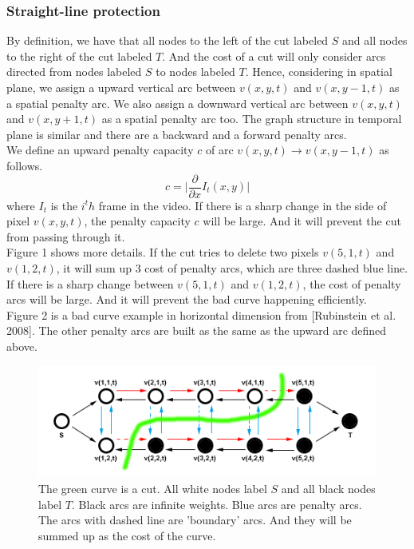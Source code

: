 \documentclass[a4paper, twocolumn]{article}
\begin{document}
			\subsubsection{Straight-line protection}
			By definition, we have that all nodes to the left of the cut labeled $S$ and all nodes to the right of the cut labeled $T$. And the cost of a cut will only consider arcs directed from nodes labeled $S$ to nodes labeled $T$. Hence, considering in spatial plane, we assign a upward vertical arc between $v(x,y,t)$ and $v(x,y-1,t)$ as a spatial penalty arc. We also assign a downward vertical arc between $v(x,y,t)$ and $v(x,y+1,t)$ as a spatial penalty arc too. The graph structure in temporal plane is similar and there are a backward and a forward penalty arcs.\\
			\linebreak
			We define an upward penalty capacity $c$ of arc $v(x,y,t) \rightarrow v(x,y-1,t)$ as follows.
			$$c = \lvert \frac{\partial}{\partial x}I_t(x,y)\lvert$$
			where $I_t$ is the $i^th$ frame in the video. If there is a sharp change in the side of pixel $v(x,y,t)$, the penalty capacity $c$ will be large. And it will prevent the cut from passing through it.\\
			\linebreak
			Figure 1 shows more details. If the cut tries to delete two pixels $v(5,1,t)$ and $v(1,2,t)$, it will sum up 3 cost of penalty arcs, which are three dashed blue line. If there is a sharp change between $v(5,1,t)$ and $v(1,2,t)$, the cost of penalty arcs will be large. And it will prevent the bad curve happening efficiently.\\
			\linebreak
			Figure 2 is a bad curve example in horizontal dimension from [Rubinstein et al. 2008]. The other penalty arcs are built as the same as the upward arc defined above.
			\begin{figure}
				\begin{center}
				\includegraphics[width=\linewidth]{Figure1.png}
				\caption{The green curve is a cut. All white nodes label $S$ and all black nodes label $T$. Black arcs are infinite weights. Blue arcs are penalty arcs. The arcs with dashed line are 'boundary' arcs. And they will be summed up as the cost of the curve.}
				\end{center}
			\end{figure}
\end{document}

